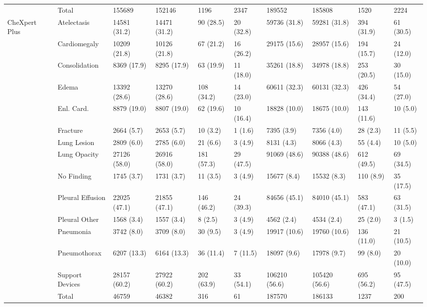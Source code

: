 \begin{tabular}{llllllllll}
 & Total & 155689 & 152146 & 1196 & 2347 & 189552 & 185808 & 1520 & 2224 \\
\cmidrule(lr){1-10}
\multirow[c]{15}{*}{CheXpert Plus} & Atelectasis & 14581 (31.2) & 14471 (31.2) & 90 (28.5) & 20 (32.8) & 59736 (31.8) & 59281 (31.8) & 394 (31.9) & 61 (30.5) \\
 & Cardiomegaly & 10209 (21.8) & 10126 (21.8) & 67 (21.2) & 16 (26.2) & 29175 (15.6) & 28957 (15.6) & 194 (15.7) & 24 (12.0) \\
 & Consolidation & 8369 (17.9) & 8295 (17.9) & 63 (19.9) & 11 (18.0) & 35261 (18.8) & 34978 (18.8) & 253 (20.5) & 30 (15.0) \\
 & Edema & 13392 (28.6) & 13270 (28.6) & 108 (34.2) & 14 (23.0) & 60611 (32.3) & 60131 (32.3) & 426 (34.4) & 54 (27.0) \\
 & Enl. Card. & 8879 (19.0) & 8807 (19.0) & 62 (19.6) & 10 (16.4) & 18828 (10.0) & 18675 (10.0) & 143 (11.6) & 10 (5.0) \\
 & Fracture & 2664 (5.7) & 2653 (5.7) & 10 (3.2) & 1 (1.6) & 7395 (3.9) & 7356 (4.0) & 28 (2.3) & 11 (5.5) \\
 & Lung Lesion & 2809 (6.0) & 2785 (6.0) & 21 (6.6) & 3 (4.9) & 8131 (4.3) & 8066 (4.3) & 55 (4.4) & 10 (5.0) \\
 & Lung Opacity & 27126 (58.0) & 26916 (58.0) & 181 (57.3) & 29 (47.5) & 91069 (48.6) & 90388 (48.6) & 612 (49.5) & 69 (34.5) \\
 & No Finding & 1745 (3.7) & 1731 (3.7) & 11 (3.5) & 3 (4.9) & 15677 (8.4) & 15532 (8.3) & 110 (8.9) & 35 (17.5) \\
 & Pleural Effusion & 22025 (47.1) & 21855 (47.1) & 146 (46.2) & 24 (39.3) & 84656 (45.1) & 84010 (45.1) & 583 (47.1) & 63 (31.5) \\
 & Pleural Other & 1568 (3.4) & 1557 (3.4) & 8 (2.5) & 3 (4.9) & 4562 (2.4) & 4534 (2.4) & 25 (2.0) & 3 (1.5) \\
 & Pneumonia & 3742 (8.0) & 3709 (8.0) & 30 (9.5) & 3 (4.9) & 19917 (10.6) & 19760 (10.6) & 136 (11.0) & 21 (10.5) \\
 & Pneumothorax & 6207 (13.3) & 6164 (13.3) & 36 (11.4) & 7 (11.5) & 18097 (9.6) & 17978 (9.7) & 99 (8.0) & 20 (10.0) \\
 & Support Devices & 28157 (60.2) & 27922 (60.2) & 202 (63.9) & 33 (54.1) & 106210 (56.6) & 105420 (56.6) & 695 (56.2) & 95 (47.5) \\
 & Total & 46759 & 46382 & 316 & 61 & 187570 & 186133 & 1237 & 200 \\
\cmidrule(lr){1-10}
\bottomrule
\end{tabular}

